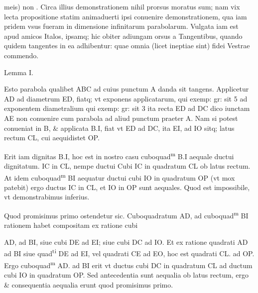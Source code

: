 \documentclass[11pt,a4paper]{article}
\begin{document}
meis) non . Circa illius demonstrationem nihil prorsus moratus sum; nam vix lecta propositione statim animaduerti ipsi conuenire demonstrationem, qua iam pridem vsus fueram in dimensione infinitarum parabolarum. Vulgata iam est apud amicos Italos, ipsamq; hic obiter adiungam orsus a Tangentibus, quando quidem tangentes in ea adhibentur: quae omnia (licet ineptiae sint) fidei Vestrae commendo.

Lemma I.

Esto parabola qualibet ABC ad cuius punctum A danda sit tangens. Applicetur AD ad diametrum ED, fiatq; vt exponens applicatarum, qui exemp: gr: sit 5 ad exponentem diametralium qui exemp: gr: sit 3 ita recta ED ad DC dico iunctam AE non conuenire cum parabola ad aliud punctum praeter A. Nam si potest conueniat in B, \& applicata B.I, fiat vt ED ad DC, ita EI, ad IO sitq; latus rectum CL, cui aequidistet OP.

Erit iam dignitas B.I, hoc est in nostro casu cuboquad\textsuperscript{m} B.I aequale ductui dignitatum. IC in CL, nempe ductui Cubi IC in quadratum CL ob latus rectum. At idem cuboquad\textsuperscript{m} BI aequatur ductui cubi IO in quadratum OP (vt mox patebit) ergo ductus IC in CL, et IO in OP sunt aequales. Quod est impossibile, vt demonstrabimus inferius.

Quod promisimus primo ostendetur sic. Cuboquadratum AD, ad cuboquad\textsuperscript{m} BI rationem habet compositam ex ratione cubi


AD, ad BI, siue cubi DE ad EI; siue cubi DC ad IO. Et ex ratione quadrati AD ad BI siue quad\textsuperscript{ti} DE ad EI, vel quadrati CE ad EO, hoc est quadrati CL. ad OP. Ergo cuboquad\textsuperscript{m} AD. ad BI erit vt ductus cubi DC in quadratum CL ad ductum cubi IO in quadratum OP. Sed antecedentia sunt aequalia ob latus rectum, ergo \& consequentia aequalia erunt quod promisimus primo.
\end{document}
